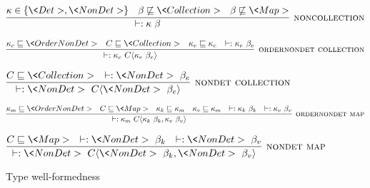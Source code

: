 \begin{figure}
    $\infer[\rulename{noncollection}]
    {\wellformed{\kappa \  \beta}}
    {\kappa \in \{ \<Det>, \<NonDet> \} & \beta \not\sqsubseteq \<Collection> & \beta \not\sqsubseteq \<Map>}$
    
    \bigskip
    
    $\infer[\rulename{ordernondet collection}]
    {\wellformed{\kappa_c \  C \angles{\kappa_e \ \beta_e}}}
    {\kappa_c \sqsubseteq \<OrderNonDet> &
      C \sqsubseteq \<Collection> &
      \kappa_e \sqsubseteq \kappa_c &
      \wellformed{\kappa_e \ \beta_e}}$
    
    \bigskip
    
    $\infer[\rulename{nondet collection}]
    {\wellformed{\<NonDet> \ C\angles{\<NonDet> \ \beta_e}}}
    {C \sqsubseteq \<Collection> & \wellformed{\<NonDet> \ \beta_e}}$
    
    \bigskip
    
%     
%     
%     
    
    $\infer[\rulename{ordernondet map}]
    {\wellformed{\kappa_m \  C \angles{\kappa_k \ \beta_k, \kappa_v \ \beta_v}}}
    {\kappa_m \sqsubseteq \<OrderNonDet>
      & C \sqsubseteq \<Map>
      & \kappa_k \sqsubseteq \kappa_m
      & \kappa_v \sqsubseteq \kappa_m
      & \wellformed{\kappa_k \ \beta_k}
      & \wellformed{\kappa_v \ \beta_v}
    }$
    
    \bigskip
    
    $\infer[\rulename{nondet map}]
    {\wellformed{\<NonDet> \ C\angles{\<NonDet> \ \beta_k, \<NonDet> \ \beta_v}}}
    {C \sqsubseteq \<Map> & \wellformed{\<NonDet> \ \beta_k} & \wellformed{\<NonDet> \ \beta_v}}$
    
    \caption{Type well-formedness}


  \label{type-validity}
\end{figure}

